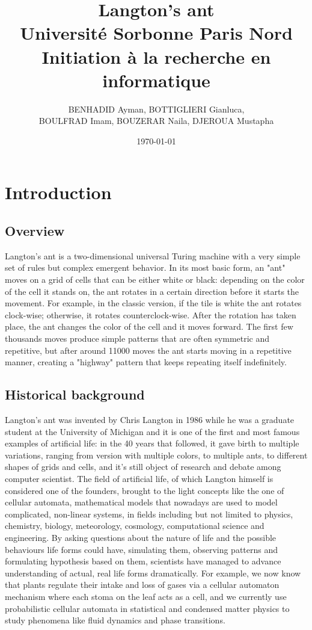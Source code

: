 \documentclass{article}
\title{Langton's ant \\  \LARGE Université Sorbonne Paris Nord \\ \large Initiation à la recherche en informatique}
\author{BENHADID Ayman, BOTTIGLIERI Gianluca, \\ BOULFRAD Imam, BOUZERAR Naila,  DJEROUA Mustapha}
\date{\today}
\begin{document}
\maketitle

\newpage

\tableofcontents

\newpage

\tableofcontents

\section{Introduction}
\subsection{Overview}
Langton's ant is a two-dimensional universal Turing machine with a very simple set of rules but complex emergent behavior. 
In its most basic form, an "ant" moves on a grid of cells that can be either white or black: depending on the color of the 
cell it stands on, the ant rotates in a certain direction before it starts the movement. For example, in the classic version, 
if the tile is white the ant rotates clock-wise; otherwise, it rotates counterclock-wise. After the rotation has taken place, 
the ant changes the color of the cell and it moves forward.
The first few thousands moves produce simple patterns that are often symmetric and repetitive, but after around 11000 moves 
the ant starts moving in a repetitive manner, creating a "highway" pattern that keeps repeating itself indefinitely.

\subsection{Historical background}
Langton's ant was invented by Chris Langton in 1986 while he was a graduate student at the University of Michigan and it is one of the first 
and most famous examples of artificial life: in the 40 years that followed, it gave birth to multiple  variations, ranging from version with 
multiple colors, to multiple ants, to different shapes of grids and cells, and it's still object of research and debate among computer scientist.
The field of artificial life, of which Langton himself is considered one of the founders, brought to the light concepts like 
the one of cellular automata, mathematical models that nowadays are used to model complicated, non-linear systems, in fields including but not limited to physics,
chemistry, biology, meteorology, cosmology, computational science and engineering. By asking questions about the nature of life and the possible
behaviours life forms could have, simulating them, observing patterns and formulating hypothesis based on them, scientists have managed to 
advance understanding of actual, real life forms dramatically. For example, we now know that plants regulate their intake and loss of gases 
via a cellular automaton mechanism where each stoma on the leaf acts as a cell, and we currently use probabilistic cellular automata 
in statistical and condensed matter physics to study phenomena like fluid dynamics and phase transitions.
\end{document}
